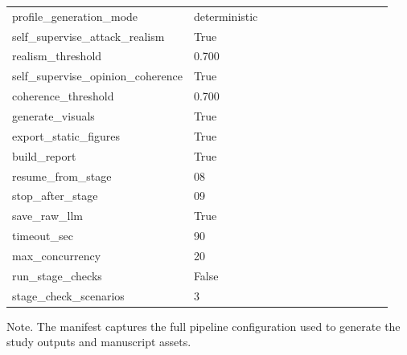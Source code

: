 \begin{table}[htbp]
\begin{threeparttable}
\begin{tabular}{p{0.24\linewidth}p{0.70\linewidth}}
profile\_generation\_mode & deterministic \\
self\_supervise\_attack\_realism & True \\
realism\_threshold & 0.700 \\
self\_supervise\_opinion\_coherence & True \\
coherence\_threshold & 0.700 \\
generate\_visuals & True \\
export\_static\_figures & True \\
build\_report & True \\
resume\_from\_stage & 08 \\
stop\_after\_stage & 09 \\
save\_raw\_llm & True \\
timeout\_sec & 90 \\
max\_concurrency & 20 \\
run\_stage\_checks & False \\
stage\_check\_scenarios & 3 \\
\bottomrule
\end{tabular}
\begin{tablenotes}[flushleft]
\footnotesize
\item Note. The manifest captures the full pipeline configuration used to generate the study outputs and manuscript assets.
\end{tablenotes}
\end{threeparttable}
\end{table}